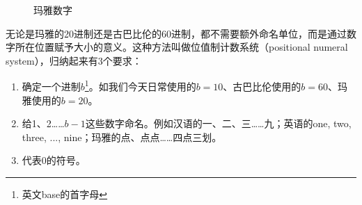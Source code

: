 \documentclass[b5paper]{ctexart}
\begin{document}
\begin{figure}[htbp]
 \centering
  \qquad
 \caption{玛雅数字}
 \label{fig:maya-numerals}
\end{figure}

无论是玛雅的20进制还是古巴比伦的60进制，都不需要额外命名单位，而是通过数字所在位置赋予大小的意义。这种方法叫做位值制计数系统（positional numeral system），归纳起来有3个要求：

\begin{enumerate}
\item 确定一个进制$b$\footnote{英文base的首字母}。如我们今天日常使用的$b = 10$、古巴比伦使用的$b = 60$、玛雅使用的$b = 20$。
\item 给1、2……$b-1$这些数字命名。例如汉语的一、二、三……九；英语的one, two, three, ..., nine；玛雅的点、点点……四点三划。
\item 代表0的符号。
\end{enumerate}
\end{document}
